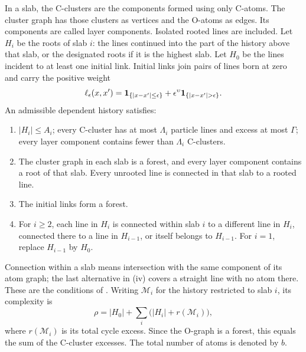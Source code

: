 \begin{definition}
In a slab, the C-clusters are the components formed using only C-atoms.
The cluster graph has those clusters as vertices and the O-atoms as
edges. Its components are called layer components. Isolated rooted
lines are included. Let \(H_i\) be the roots of slab \(i\): the lines
continued into the part of the history above that slab, or the designated
roots if it is the highest slab. Let \(H_0\) be the lines incident to at
least one initial link. Initial links join pairs of lines born at zero
and carry the positive weight
\begin{equation}\label{eq:dhm-initial-link}
 \ell_\eps(x,x')
 =\ind_{\{|x-x'|\le\eps\}}
   +\eps^\upsilon\ind_{\{|x-x'|>\eps\}}.
\end{equation}
An admissible dependent history satisfies:
\begin{enumerate}[label=(\roman*)]
 \item \(|H_i|\le A_i\); every C-cluster has at most \(\Lambda_i\)
 particle lines and excess at most \(\Gamma\); every layer component
 contains fewer than \(\Lambda_i\) C-clusters.
 \item The cluster graph in each slab is a forest, and every layer
 component contains a root of that slab. Every unrooted line is
 connected in that slab to a rooted line.
 \item The initial links form a forest.
 \item For \(i\ge2\), each line in \(H_i\) is connected within slab
 \(i\) to a different line in \(H_i\), connected there to a line in
 \(H_{i-1}\), or itself belongs to \(H_{i-1}\). For \(i=1\), replace
 \(H_{i-1}\) by \(H_0\).
\end{enumerate}
Connection within a slab means intersection with the same component of
its atom graph; the last alternative in (iv) covers a straight line
with no atom there. These are the conditions of
\cite[Definition 3.20(1)]{DHM2025}. Writing \(\mathcal M_i\) for
the history restricted to slab \(i\), its complexity is
\begin{equation}\label{eq:dhm-complexity}
 \rho=|H_0|+\sum_i\bigl(|H_i|+r(\mathcal M_i)\bigr),
\end{equation}
where \(r(\mathcal M_i)\) is its total cycle excess. Since the
O-graph is a forest, this equals the sum of the C-cluster excesses.
The total number of atoms is denoted by \(b\).
\end{definition}

